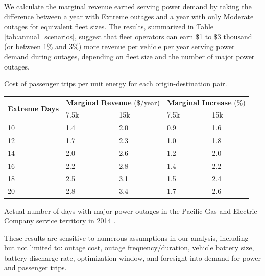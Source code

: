 \documentclass[journal]{IEEEtran}
\begin{document}
We calculate the marginal revenue earned serving power demand by taking the difference between a year with Extreme outages and a year with only Moderate outages for equivalent fleet sizes. The results, summarized in Table \ref{tab:annual_scenarios}, suggest that fleet operators can earn \$1 to \$3 thousand (or between 1\% and 3\%) more revenue per vehicle per year serving power demand during outages, depending on fleet size and the number of major power outages.

\begin{threeparttable}[!htbp]
    \renewcommand{\arraystretch}{1}
    \caption{Cost of passenger trips per unit energy for each origin-destination pair.}
    \label{tab:annual_scenarios}
    \centering
    \def\colmargin{6.75cm}
    \footnotesize{
    \begin{tabular}{p{1cm}p{1cm}p{1cm}p{1cm}p{1cm}}
    \hline
    \multirow{2}{1cm}{\textbf{Extreme Days}} & \multicolumn{2}{c}{\textbf{Marginal Revenue} (\$/year)} & \multicolumn{2}{c}{\textbf{Marginal Increase} (\%)} \\
     & 7.5k & 15k & 7.5k & 15k \\
    \hline
    10 & 1.4 & 2.0 & 0.9 & 1.6 \\
    12 & 1.7 & 2.3 & 1.0 & 1.8 \\
    14 & 2.0 & 2.6 & 1.2 & 2.0 \\
    16\tnote{\textasteriskcentered} & 2.2 & 2.8 & 1.4 & 2.2 \\
    18 & 2.5 & 3.1 & 1.5 & 2.4 \\
    20 & 2.8 & 3.4 & 1.7 & 2.6 \\
    \hline
    \end{tabular}
      \begin{tablenotes}
        \footnotesize
        \item[\textasteriskcentered] Actual number of days with major power outages in the Pacific Gas and Electric Company service territory in 2014 \cite{pge_reliability_2014}.
      \end{tablenotes}}
\end{threeparttable}

These results are sensitive to numerous assumptions in our analysis, including but not limited to: outage cost, outage frequency/duration, vehicle battery size, battery discharge rate, optimization window, and foresight into demand for power and passenger trips.
\end{document}
